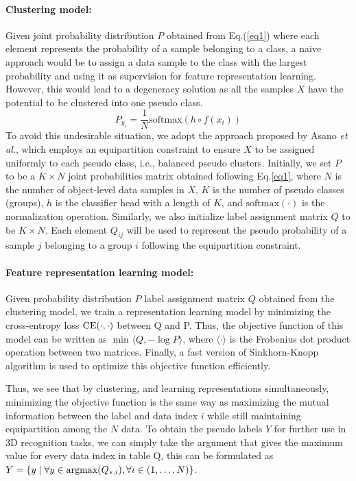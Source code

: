 \documentclass{article}
\begin{document}
\paragraph{Clustering model:} Given joint probability distribution $P$ obtained from Eq.(\ref{eq1}) where each element represents the probability of a sample belonging to a class, a naive approach would be to assign a data sample to the class with the largest probability
and using it as supervision for feature representation learning. However, this would lead to a degeneracy solution as all the samples $X$ have the potential to be clustered into one pseudo class. 
\begin{equation}
    P_{y_{i}} = \frac{1}{N}\mbox{softmax}(h \circ f(x_{i})) \label{eq1}
\end{equation} 
\setlength{\parskip}{0.0em}
To avoid this undesirable situation, we adopt the approach proposed by Asano \textit{et al.}\cite{asano2020self}, which employs an equipartition constraint to ensure $X$ to be assigned uniformly to each pseudo class, i.e., balanced pseudo clusters. 
Initially, we set $P$ to be a $K\times N$ joint probabilities matrix obtained following Eq.\eqref{eq1}, where $N$ is the number of object-level data samples in $X$, $K$ is the number of pseudo classes (groups), $h$ is the classifier head with a length of $K$, and $\mbox{softmax}(\cdot)$ is the normalization operation. Similarly, we also initialize label assignment matrix $Q$ to be $K\times N$. Each element $Q_{ij}$ will be used to represent the pseudo probability of a sample $j$ belonging to a group $i$ following the equipartition constraint.

\paragraph{Feature representation learning model:} Given probability distribution $P$ label assignment matrix $Q$ obtained from the clustering model, we train a representation learning model by minimizing the cross-entropy loss $\hbox{CE}(\cdot,\cdot)$ between Q and P. Thus, the objective function of this model can be written as $\min_{}  \langle Q, -\log P \rangle$, where $\langle \cdot \rangle$ is the Frobenius dot product operation between two matrices. Finally, a fast version of Sinkhorn-Knopp algorithm \cite{cuturi2013sinkhorn} is used to optimize this objective function efficiently.

\setlength{\parskip}{0.0em}

Thus, we see that by clustering, and learning representations simultaneously, minimizing the objective function is the same way as maximizing the mutual information between the label and data index $i$ while still maintaining equipartition among the $N$ data. To obtain the pseudo labels $Y$ for further use in 3D recognition tasks, we can simply take the argument that gives the maximum value for every data index in table Q, this can be formulated as $Y = \{ y \mid \forall y \in \hbox{argmax}(Q_{*,i}), \forall i \in (1,\dots, N)\}$.
\end{document}
